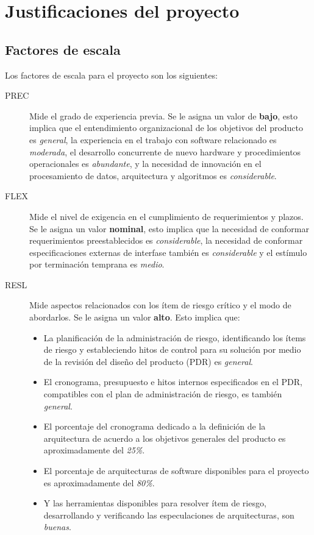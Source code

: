 \documentclass[11pt,a4paper,spanish,twoside]{report}
\begin{document}
\chapter{Justificaciones del proyecto}
\section{Factores de escala}
Los factores de escala para el proyecto son los siguientes:
\begin{description}
\item[PREC] Mide el grado de experiencia previa. Se le asigna un valor de
\textbf{bajo}, esto implica que el entendimiento organizacional de los
objetivos del producto es \emph{general}, la experiencia en el trabajo con 
software relacionado es \emph{moderada}, el desarrollo concurrente de nuevo
hardware y procedimientos operacionales es \emph{abundante}, y la necesidad
de innovación en el procesamiento de datos, arquitectura y algoritmos es
\emph{considerable}.

\item[FLEX] Mide el nivel de exigencia en el cumplimiento de requerimientos
y plazos. Se le asigna un valor \textbf{nominal}, esto implica que la
necesidad de conformar requerimientos preestablecidos es \emph{considerable},
la necesidad de conformar especificaciones externas de interfase también es
\emph{considerable} y el estímulo por terminación temprana es \emph{medio}.

\item[RESL] Mide aspectos relacionados con los ítem de riesgo crítico y el
modo de abordarlos. Se le asigna un valor \textbf{alto}. Esto implica que:
\begin{itemize}
\item La planificación de la administración de riesgo, identificando los
ítems de riesgo y estableciendo hitos de control para su solución por medio
de la revisión del diseño del producto (PDR) es \emph{general}.
\item El cronograma, presupuesto e hitos internos especificados en el PDR,
compatibles con el plan de administración de riesgo, es también \emph{general}.
\item El porcentaje del cronograma dedicado a la definición de la arquitectura
de acuerdo a los objetivos generales del producto es aproximadamente del
\emph{25\%}.
\item El porcentaje de arquitecturas de software disponibles para el proyecto
es aproximadamente del \emph{80\%}.
\item Y las herramientas disponibles para resolver ítem de riesgo,
desarrollando y verificando las especulaciones de arquitecturas, son
\emph{buenas}.
\end{itemize}


\end{description}
\end{document}
